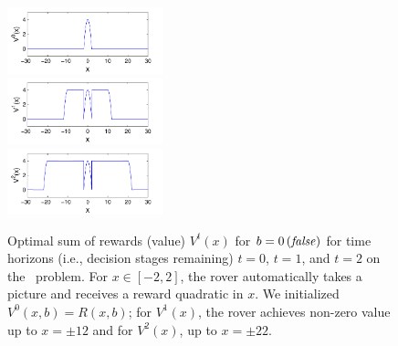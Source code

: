 \begin{figure}[t!]
\centering
\includegraphics[width=0.4\textwidth]{Figures1/v1_mr.pdf}\\
\includegraphics[width=0.4\textwidth]{Figures1/v2_mr.pdf}\\
\includegraphics[width=0.4\textwidth]{Figures1/v3_mr.pdf}
\vspace{-2mm}
\caption{\footnotesize Optimal sum of rewards (value) 
$V^t(x)$ for $b = 0 \, 
(\mathit{false})$ for time horizons (i.e., decision stages remaining) $t=0$,
$t=1$, and $t=2$ on the \MarsRover\ problem.  For $x \in [-2,2]$, the
rover automatically takes a picture and receives a reward quadratic in
$x$.  We initialized $V^0(x,b) = R(x,b)$; for $V^1(x)$, the rover achieves
non-zero value up to $x = \pm 12$ and for 
$V^2(x)$, up to $x = \pm 22$.}
\label{fig:opt_graph}
\end{figure}

